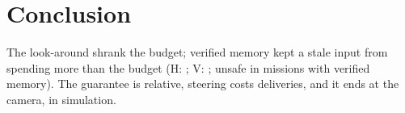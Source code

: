 \documentclass[conference]{IEEEtran}
\begin{document}
\section{Conclusion}
The look-around shrank the budget; verified memory kept a stale input from spending more than the budget (H: \HHeadline; V: \StatV; \MemPooltwo{} unsafe in \MemPoolN{} missions with verified memory). The guarantee is relative, steering costs deliveries, and it ends at the camera, in simulation.



\end{document}
